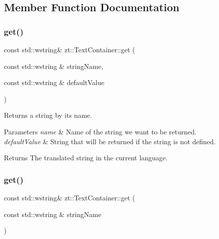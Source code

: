 \subsection{Member Function Documentation}
\mbox{\label{classzt_1_1_text_container_a851271c69f57caf2ea62fcc63ee96c78}} 
\subsubsection{\texorpdfstring{get()}{get()}\hspace{0.1cm}{\footnotesize\ttfamily [1/2]}}
{\footnotesize\ttfamily const std\+::wstring\& zt\+::\+Text\+Container\+::get (\begin{DoxyParamCaption}\item[{const std\+::wstring \&}]{string\+Name,  }\item[{const std\+::wstring \&}]{default\+Value }\end{DoxyParamCaption})}



Returns a string by its name. 


\begin{DoxyParams}{Parameters}
{\em name} & Name of the string we want to be returned. \\
\hline
{\em default\+Value} & String that will be returned if the string is not defined. \\
\hline
\end{DoxyParams}
\begin{DoxyReturn}{Returns}
The translated string in the current language. 
\end{DoxyReturn}
\mbox{\label{classzt_1_1_text_container_a1d8c6bec235308f322cd61cf87a1824d}} 
\subsubsection{\texorpdfstring{get()}{get()}\hspace{0.1cm}{\footnotesize\ttfamily [2/2]}}
{\footnotesize\ttfamily const std\+::wstring\& zt\+::\+Text\+Container\+::get (\begin{DoxyParamCaption}\item[{const std\+::wstring \&}]{string\+Name }\end{DoxyParamCaption})}



